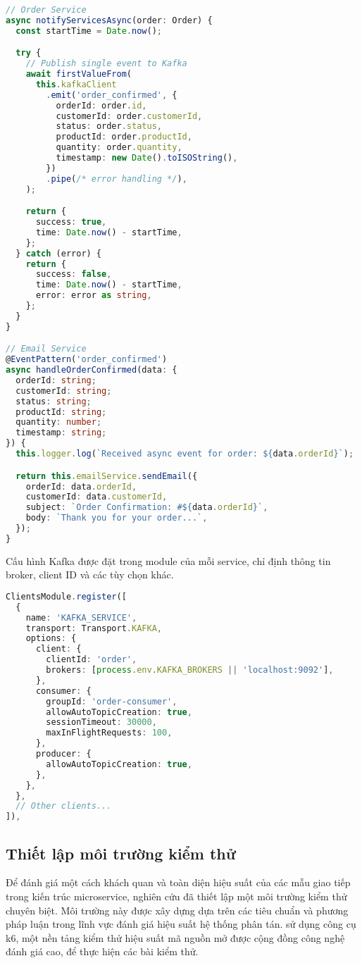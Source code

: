 \begin{lstlisting}[language=Typescript]
// Order Service
async notifyServicesAsync(order: Order) {
  const startTime = Date.now();

  try {
    // Publish single event to Kafka
    await firstValueFrom(
      this.kafkaClient
        .emit('order_confirmed', {
          orderId: order.id,
          customerId: order.customerId,
          status: order.status,
          productId: order.productId,
          quantity: order.quantity,
          timestamp: new Date().toISOString(),
        })
        .pipe(/* error handling */),
    );

    return {
      success: true,
      time: Date.now() - startTime,
    };
  } catch (error) {
    return {
      success: false,
      time: Date.now() - startTime,
      error: error as string,
    };
  }
}

// Email Service
@EventPattern('order_confirmed')
async handleOrderConfirmed(data: {
  orderId: string;
  customerId: string;
  status: string;
  productId: string;
  quantity: number;
  timestamp: string;
}) {
  this.logger.log(`Received async event for order: ${data.orderId}`);

  return this.emailService.sendEmail({
    orderId: data.orderId,
    customerId: data.customerId,
    subject: `Order Confirmation: #${data.orderId}`,
    body: `Thank you for your order...`,
  });
}
\end{lstlisting}

Cấu hình Kafka được đặt trong module của mỗi service, chỉ định thông tin broker, client ID và các tùy chọn khác.

\begin{lstlisting}[language=Typescript]
ClientsModule.register([
  {
    name: 'KAFKA_SERVICE',
    transport: Transport.KAFKA,
    options: {
      client: {
        clientId: 'order',
        brokers: [process.env.KAFKA_BROKERS || 'localhost:9092'],
      },
      consumer: {
        groupId: 'order-consumer',
        allowAutoTopicCreation: true,
        sessionTimeout: 30000,
        maxInFlightRequests: 100,
      },
      producer: {
        allowAutoTopicCreation: true,
      },
    },
  },
  // Other clients...
]),
\end{lstlisting}

\subsection{Thiết lập môi trường kiểm thử}
Để đánh giá một cách khách quan và toàn diện hiệu suất của các mẫu giao tiếp trong kiến trúc microservice, nghiên cứu đã thiết lập một môi trường kiểm thử chuyên biệt. Môi trường này được xây dựng dựa trên các tiêu chuẩn và phương pháp luận trong lĩnh vực đánh giá hiệu suất hệ thống phân tán. sử dụng công cụ k6, một nền tảng kiểm thử hiệu suất mã nguồn mở được cộng đồng công nghệ đánh giá cao, để thực hiện các bài kiểm thử.

